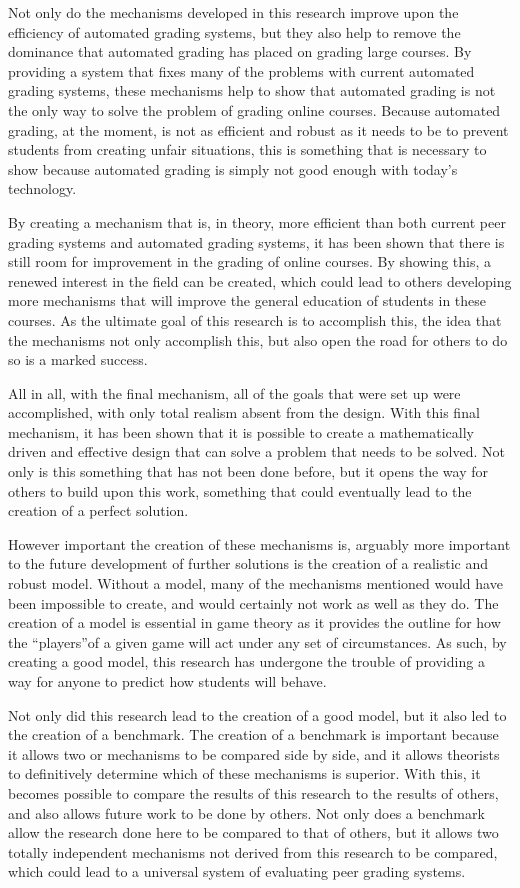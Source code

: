 \documentclass[12pt, Arial]{article}
\begin{document}
Not only do the mechanisms developed in this research improve upon the efficiency of automated grading systems, but they also help to remove the dominance that automated grading has placed on grading large courses. By providing a system that fixes many of the problems with current automated grading systems, these mechanisms help to show that automated grading is not the only way to solve the problem of grading online courses. Because automated grading, at the moment, is not as efficient and robust as it needs to be to prevent students from creating unfair situations, this is something that is necessary to show because automated grading is simply not good enough with today's technology.

By creating a mechanism that is, in theory, more efficient than both current peer grading systems and automated grading systems, it has been shown that there is still room for improvement in the grading of online courses. By showing this, a renewed interest in the field can be created, which could lead to others developing more mechanisms that will improve the general education of students in these courses. As the ultimate goal of this research is to accomplish this, the idea that the mechanisms not only accomplish this, but also open the road for others to do so is a marked success.

All in all, with the final mechanism, all of the goals that were set up were accomplished, with only total realism absent from the design. With this final mechanism, it has been shown that it is possible to create a mathematically driven and effective design that can solve a problem that needs to be solved. Not only is this something that has not been done before, but it opens the way for others to build upon this work, something that could eventually lead to the creation of a perfect solution. 

However important the creation of these mechanisms is, arguably more important to the future development of further solutions is the creation of a realistic and robust model. Without a model, many of the mechanisms mentioned would have been impossible to create, and would certainly not work as well as they do. The creation of a model is essential in game theory as it provides the outline for how the ``players''of a given game will act under any set of circumstances. As such, by creating a good model, this research has undergone the trouble of providing a way for anyone to predict how students will behave. 

Not only did this research lead to the creation of a good model, but it also led to the creation of a benchmark. The creation of a benchmark is important because it allows two or mechanisms to be compared side by side, and it allows theorists to definitively determine which of these mechanisms is superior. With this, it becomes possible to compare the results of this research to the results of others, and also allows future work to be done by others. Not only does a benchmark allow the research done here to be compared to that of others, but it allows two totally independent mechanisms not derived from this research to be compared, which could lead to a universal system of evaluating peer grading systems.
\end{document}
